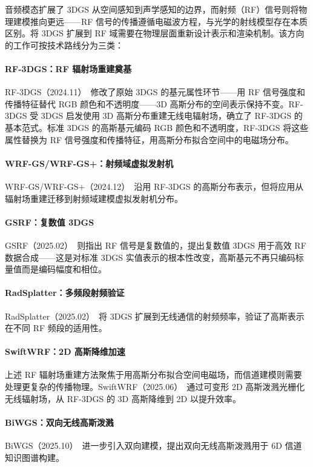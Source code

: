 音频模态扩展了 3DGS 从空间感知到声学感知的边界，而射频（RF）信号则将物理建模推向更远——RF 信号的传播遵循电磁波方程，与光学的射线模型存在本质区别。将 3DGS 扩展到 RF 域需要在物理层面重新设计表示和渲染机制。该方向的工作可按技术路线分为三类：

\paragraph{RF-3DGS：RF 辐射场重建奠基}
RF-3DGS（2024.11）~\cite{2411_19420}修改了原始 3DGS 的基元属性环节——用 RF 信号强度和传播特征替代 RGB 颜色和不透明度——3D 高斯分布的空间表示保持不变。RF-3DGS 受 3DGS 启发使用 3D 高斯分布重建无线电辐射场，确立了 RF-3DGS 的基本范式。标准 3DGS 的高斯基元编码 RGB 颜色和不透明度，RF-3DGS 将这些属性替换为 RF 信号强度和传播特征，用高斯分布拟合空间中的电磁场分布。

\paragraph{WRF-GS/WRF-GS+：射频域虚拟发射机}
WRF-GS/WRF-GS+（2024.12）~\cite{2412_04832}沿用 RF-3DGS 的高斯分布表示，但将应用从辐射场重建迁移到射频域建模虚拟发射机分布。

\paragraph{GSRF：复数值 3DGS}
GSRF（2025.02）~\cite{2502_01826}则指出 RF 信号是复数值的，提出复数值 3DGS 用于高效 RF 数据合成——这是对标准 3DGS 实值表示的根本性改变，高斯基元不再只编码标量值而是编码幅度和相位。

\paragraph{RadSplatter：多频段射频验证}
RadSplatter（2025.02）~\cite{2502_12686}将 3DGS 扩展到无线通信的射频频率，验证了高斯表示在不同 RF 频段的适用性。

\paragraph{SwiftWRF：2D 高斯降维加速}
上述 RF 辐射场重建方法聚焦于用高斯分布拟合空间电磁场，而信道建模则需要处理更复杂的传播物理。SwiftWRF（2025.06）~\cite{2506_12787}通过可变形 2D 高斯泼溅光栅化无线辐射场，从 RF-3DGS 的 3D 高斯降维到 2D 以提升效率。

\paragraph{BiWGS：双向无线高斯泼溅}
BiWGS（2025.10）~\cite{2510_26166}进一步引入双向建模，提出双向无线高斯泼溅用于 6D 信道知识图谱构建。

